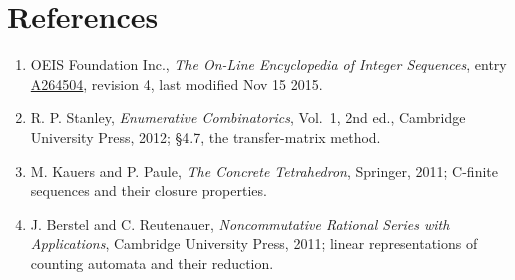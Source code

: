 \documentclass[11pt]{article}
\theoremstyle{definition}
\begin{document}
\section{References}

\begin{enumerate}

\item OEIS Foundation Inc., \emph{The On-Line Encyclopedia of Integer Sequences}, entry \href{https://oeis.org/A264504}{A264504}, revision 4, last modified Nov 15 2015.

\item R. P. Stanley, \emph{Enumerative Combinatorics}, Vol.~1, 2nd ed., Cambridge University Press, 2012; \S4.7, the transfer-matrix method.

\item M. Kauers and P. Paule, \emph{The Concrete Tetrahedron}, Springer, 2011; C-finite sequences and their closure properties.

\item J. Berstel and C. Reutenauer, \emph{Noncommutative Rational Series with Applications}, Cambridge University Press, 2011; linear representations of counting automata and their reduction.

\end{enumerate}
\end{document}
